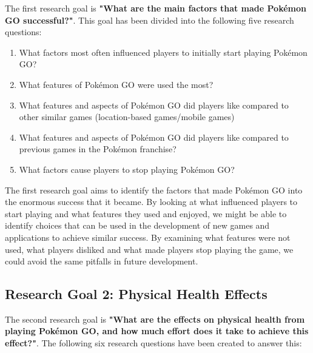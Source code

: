 The first research goal is \textbf{"What are the main factors that made Pokémon GO successful?"}. This goal has been divided into the following five research questions:

\begin{enumerate}[label=RQ1.{\arabic*}]
	\item What factors most often influenced players to initially start playing Pokémon GO?\label{RQ1.1}
	\item What features of Pokémon GO were used the most?\label{RQ1.2}
	\item What features and aspects of Pokémon GO did players like compared to other similar games (location-based games/mobile games)\label{RQ1.3}
	\item What features and aspects of Pokémon GO did players like compared to previous games in the Pokémon franchise?\label{RQ1.4}
	\item What factors cause players to stop playing Pokémon GO?\label{RQ1.5}
\end{enumerate}

The first research goal aims to identify the factors that made Pokémon GO into the enormous success that it became. By looking at what influenced players to start playing and what features they used and enjoyed, we might be able to identify choices that can be used in the development of new games and applications to achieve similar success. By examining what features were not used, what players disliked and what made players stop playing the game, we could avoid the same pitfalls in future development.

\subsection{Research Goal 2: Physical Health Effects}
\label{rg2}

The second research goal is \textbf{"What are the effects on physical health from playing Pokémon GO, and how much effort does it take to achieve this effect?"}. The following six research questions have been created to answer this:

